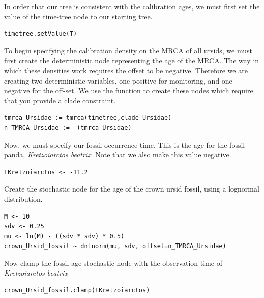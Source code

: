 In order that our tree is consistent with the calibration ages, we must first set the value of the time-tree node to our starting tree.
{\tt \begin{snugshade*}
\begin{lstlisting}
timetree.setValue(T)
\end{lstlisting}
\end{snugshade*}}

To begin specifying the calibration density on the MRCA of all ursids, we must first create the deterministic node representing the age of the MRCA.
The way in which these densities work requires the offset to be negative. 
Therefore we are creating two deterministic variables, one positive for monitoring, and one negative for the off-set.
We use the  function to create these nodes which require that you provide a clade constraint.
{\tt \begin{snugshade*}
\begin{lstlisting}
tmrca_Ursidae := tmrca(timetree,clade_Ursidae)
n_TMRCA_Ursidae := -(tmrca_Ursidae)
\end{lstlisting}
\end{snugshade*}}

Now, we must specify our fossil occurrence time.
This is the age for the fossil panda, \textit{Kretzoiarctos beatrix}.
Note that we also make this value negative.
{\tt \begin{snugshade*}
\begin{lstlisting}
tKretzoiarctos <- -11.2
\end{lstlisting}
\end{snugshade*}}

Create the stochastic node for the age of the crown ursid fossil, using a lognormal distribution.
{\tt \begin{snugshade*}
\begin{lstlisting}
M <- 10
sdv <- 0.25
mu <- ln(M) - ((sdv * sdv) * 0.5)
crown_Ursid_fossil ~ dnLnorm(mu, sdv, offset=n_TMRCA_Ursidae)
\end{lstlisting}
\end{snugshade*}}

Now clamp the fossil age stochastic node with the observation time of \textit{Kretzoiarctos beatrix}
{\tt \begin{snugshade*}
\begin{lstlisting}
crown_Ursid_fossil.clamp(tKretzoiarctos)
\end{lstlisting}
\end{snugshade*}}


